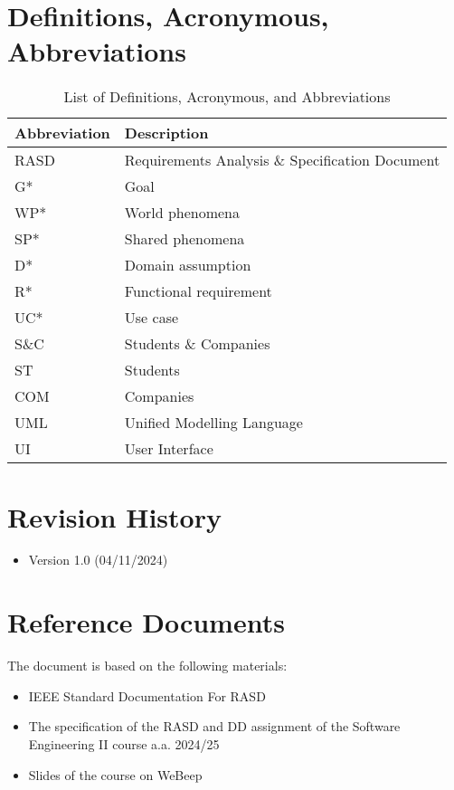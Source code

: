\section{Definitions, Acronymous, Abbreviations}
\begin{table}[H]
\centering
\begin{tabular}{|l|l|}
\hline
\textbf{Abbreviation} & \textbf{Description} \\ \hline
RASD & Requirements Analysis \& Specification Document \\ \hline
G* & Goal \\ \hline
WP* & World phenomena \\ \hline
SP* & Shared phenomena \\ \hline
D* & Domain assumption \\ \hline
R* & Functional requirement \\ \hline
UC* & Use case \\ \hline
S\&C & Students \& Companies \\ \hline
ST & Students \\ \hline
COM & Companies \\ \hline
UML & Unified Modelling Language \\ \hline
UI & User Interface \\ \hline
\end{tabular}
\caption{List of Definitions, Acronymous, and Abbreviations}
\label{table:abbreviations}
\end{table}

  
\section{Revision History}

\begin{itemize}
    \item Version 1.0 (04/11/2024)
\end{itemize}

\section{Reference Documents}

The document is based on the following materials:

\begin{itemize}
    \item IEEE Standard Documentation For RASD
    \item The specification of the RASD and DD assignment of the Software Engineering II course a.a. 2024/25 
    \item Slides of the course on WeBeep
\end{itemize}


